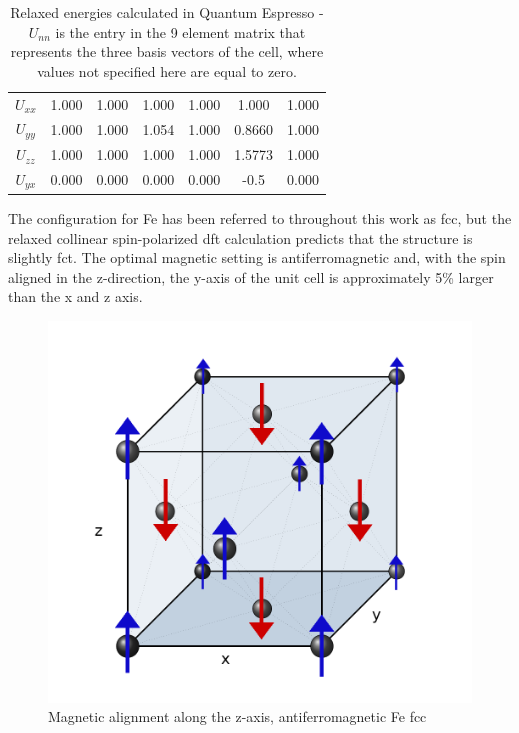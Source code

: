 \begin{landscape}
\begin{table}[h]
\begin{center}
\begin{tabular}{c c c c c c c}
$U_{xx}$                   & 1.000           & 1.000            & 1.000              & 1.000              & 1.000            & 1.000           \\
$U_{yy}$                   & 1.000           & 1.000            & 1.054              & 1.000               & 0.8660            & 1.000          \\
$U_{zz}$                   & 1.000           & 1.000            & 1.000              & 1.000                & 1.5773            & 1.000         \\
$U_{yx}$                   & 0.000           & 0.000            & 0.000              & 0.000                & -0.5            & 0.000         \\
\hline\hline
\end{tabular}
\end{center}
\caption{Relaxed energies calculated in Quantum Espresso - $U_{nn}$ is the entry in the 9 element matrix that represents the three basis vectors of the cell, where values not specified here are equal to zero.}
\label{table:relaxedenergies}
\end{table}

\end{landscape}
\clearpage


The configuration for Fe has been referred to throughout this work as \acrshort{fcc}, but the relaxed collinear spin-polarized \acrshort{dft} calculation predicts that the structure is slightly \acrfull{fct}.  The optimal magnetic setting is antiferromagnetic and, with the spin aligned in the z-direction, the y-axis of the unit cell is approximately 5\% larger than the x and z axis.

\begin{figure}[ht] 
  \centering
  \includegraphics[width=.7\linewidth]{chapters/potentials_fe_pd_ru/images/fe-austenitic-mag.png} 
  \caption{Magnetic alignment along the z-axis, antiferromagnetic Fe \acrshort{fcc}}  
  \label{fig:ironfccantiferromagnetic}
\end{figure}

